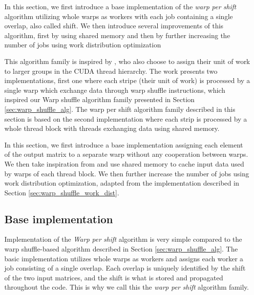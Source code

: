 In this section, we first introduce a base implementation of the \textit{warp per shift} algorithm utilizing whole warps as workers with each job containing a single overlap, also called shift. We then introduce several improvements of this algorithm, first by using shared memory and then by further increasing the number of jobs using work distribution optimization

This algorithm family is inspired by \citet{paper:levenstein}, who also choose to assign their unit of work to larger groups in the CUDA thread hierarchy. The work presents two implementations, first one where each stripe (their unit of work) is processed by a single warp which exchange data through warp shuffle instructions, which inspired our Warp shuffle algorithm family presented in Section \ref{sec:warp_shuffle_alg}. The warp per shift algorithm family described in this section is based on the second implementation where each strip is processed by a whole thread block with threads exchanging data using shared memory. 

In this section, we first introduce a base implementation assigning each element of the output matrix to a separate warp without any cooperation between warps. We then take inspiration from \citet{paper:levenstein} and use shared memory to cache input data used by warps of each thread block. We then further increase the number of jobs using work distribution optimization, adapted from the implementation described in Section \ref{sec:warp_shuffle_work_dist}. 

\subsection{Base implementation}



Implementation of the \textit{Warp per shift} algorithm is very simple compared to the warp shuffle-based algorithm described in Section \ref{sec:warp_shuffle_alg}. The basic implementation utilizes whole warps as workers and assigns each worker a job consisting of a single overlap. Each overlap is uniquely identified by the shift of the two input matrices, and the shift is what is stored and propagated throughout the code. This is why we call this the \textit{warp per shift} algorithm family.

